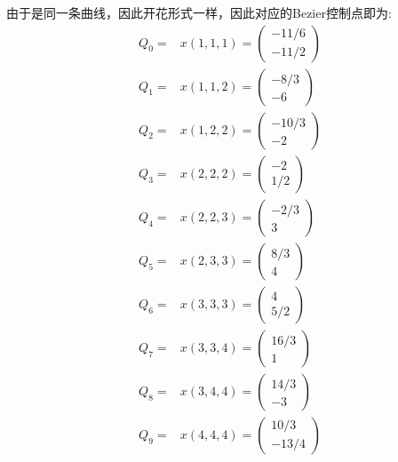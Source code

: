 \documentclass{article}
\begin{document}
	由于是同一条曲线，因此开花形式一样，因此对应的Bezier控制点即为:
	\begin{equation}
		\begin{aligned}
			Q_0=&x(1,1,1)=\left(\begin{array}{c} -11/6\\-11/2 \end{array}\right)\\
			Q_1=&x(1,1,2)=\left(\begin{array}{c} -8/3\\-6 \end{array}\right)\\
			Q_2=&x(1,2,2)=\left(\begin{array}{c} -10/3\\-2 \end{array}\right)\\
			Q_3=&x(2,2,2)=\left(\begin{array}{c} -2\\1/2 \end{array}\right)\\
			Q_4=&x(2,2,3)=\left(\begin{array}{c} -2/3\\3 \end{array}\right)\\
			Q_5=&x(2,3,3)=\left(\begin{array}{c} 8/3\\4 \end{array}\right)\\
			Q_6=&x(3,3,3)=\left(\begin{array}{c} 4\\5/2 \end{array}\right)\\
			Q_7=&x(3,3,4)=\left(\begin{array}{c} 16/3\\1 \end{array}\right)\\
			Q_8=&x(3,4,4)=\left(\begin{array}{c} 14/3\\-3 \end{array}\right)\\
			Q_9=&x(4,4,4)=\left(\begin{array}{c} 10/3\\-13/4 \end{array}\right)\\
		\end{aligned}
	\end{equation}
	
\end{document}
